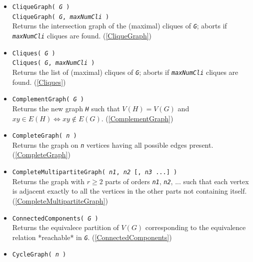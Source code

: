 \documentclass[a4paper,11pt]{report}
\begin{document}
{{\begin{itemize}
 Returns minimal $(1, 2, ..., n)$-invariant graph where vertex 1 is adjacent to vertices in \mbox{\texttt{\mdseries\slshape Jumps}}. (\ref{Circulant}) 
\item \texttt{CliqueGraph( \mbox{\texttt{\mdseries\slshape G}} )}\\
 \texttt{CliqueGraph( \mbox{\texttt{\mdseries\slshape G}}, \mbox{\texttt{\mdseries\slshape maxNumCli}} )}\\
 Returns the intersection graph of the (maximal) cliques of \mbox{\texttt{\mdseries\slshape G}}; aborts if \mbox{\texttt{\mdseries\slshape maxNumCli}} cliques are found. (\ref{CliqueGraph}) 
\item \texttt{Cliques( \mbox{\texttt{\mdseries\slshape G}} )}\\
 \texttt{Cliques( \mbox{\texttt{\mdseries\slshape G}}, \mbox{\texttt{\mdseries\slshape maxNumCli}} )}\\
 Returns the list of (maximal) cliques of \mbox{\texttt{\mdseries\slshape G}}; aborts if \mbox{\texttt{\mdseries\slshape maxNumCli}} cliques are found. (\ref{Cliques}) 
\item \texttt{ComplementGraph( \mbox{\texttt{\mdseries\slshape G}} )}\\
 Returns the new graph \mbox{\texttt{\mdseries\slshape H}} such that $V(H)=V(G)$ and $xy\in E(H) \iff xy \not\in E(G)$. (\ref{ComplementGraph}) 
\item \texttt{CompleteGraph( \mbox{\texttt{\mdseries\slshape n}} )}\\
 Returns the graph on \mbox{\texttt{\mdseries\slshape n}} vertices having all possible edges present. (\ref{CompleteGraph}) 
\item \texttt{CompleteMultipartiteGraph( \mbox{\texttt{\mdseries\slshape n1}}, \mbox{\texttt{\mdseries\slshape n2}} [, \mbox{\texttt{\mdseries\slshape n3}} ...] )}\\
 Returns the graph with $r\geq 2$ parts of orders \mbox{\texttt{\mdseries\slshape n1}}, \mbox{\texttt{\mdseries\slshape n2}}, ... such that each vertex is adjacent exactly to all the vertices in the
other parts not containing itself. (\ref{CompleteMultipartiteGraph}) 
\item \texttt{ConnectedComponents( \mbox{\texttt{\mdseries\slshape G}} )}\\
 Returns the equivalece partition of $V(G)$ corresponding to the equivalence relation *reachable* in \mbox{\texttt{\mdseries\slshape G}}. (\ref{ConnectedComponents}) 
\item \texttt{CycleGraph( \mbox{\texttt{\mdseries\slshape n}} )}\\

\end{itemize}}}
\end{document}
